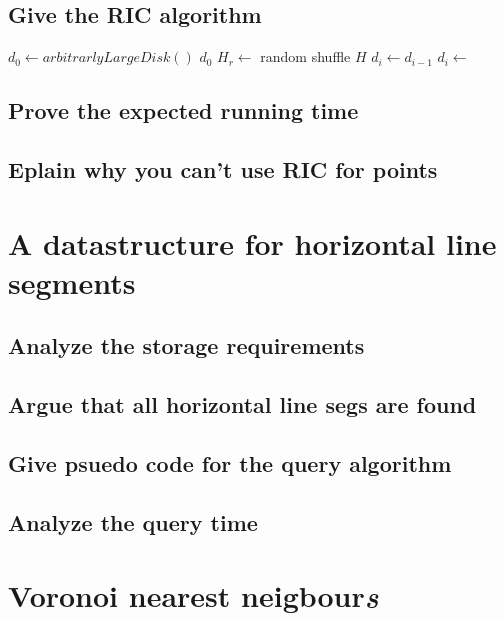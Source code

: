 \documentclass{article}
\begin{document}
\subsection{Give the RIC algorithm}

\begin{algorithmic}[1]
		\State
		$d_0 \gets arbitrarlyLargeDisk()$
			\State
			\Return $d_0$
		\EndIf
		\State
		$H_r \gets$ random shuffle $H$
			\State
			$d_i \gets d_{i-1}$
				$d_i \gets$
			\EndIf
		\EndFor
	\EndFunction
\end{algorithmic}

\subsection{Prove the expected running time}
\subsection{Eplain why you can't use RIC for points}
\section{A datastructure for horizontal line segments}

\subsection{Analyze the storage requirements}
\subsection{Argue that all horizontal line segs are found}
\subsection{Give psuedo code for the query algorithm}

\subsection{Analyze the query time}

\section{Voronoi nearest neigbour\emph{s}}
\end{document}
